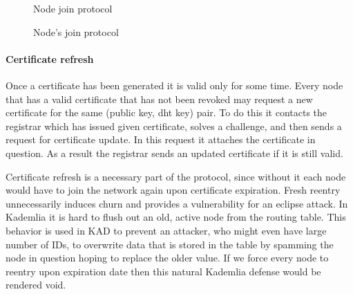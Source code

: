 \begin{figure}
\begin{msc}{Node join protocol}
\setlength{\instdist}{5.5cm}
\setlength{\envinstdist}{3cm}
\setlength{\instwidth}{2.5cm}
\nextlevel
{}
\nextlevel[5]
\nextlevel
{}
\nextlevel[1]


\nextlevel[6]


\nextlevel


\nextlevel[2]
\nextlevel[1]
\end{msc}
\caption{Node's join protocol}
\label{fig:node_join_prot}
\end{figure}

\paragraph{Certificate refresh} Once a certificate has been generated it is
valid only for some time. Every node that has a valid certificate that has not
been revoked may request a new certificate for the same (public key, dht key)
pair.
To do this it contacts the registrar which has issued given certificate,
solves a challenge, and then sends a request for certificate update.
In this request it attaches the certificate in question. As a result the
registrar sends an updated certificate if it is still valid.

Certificate refresh is a necessary part of the protocol, since without it each
node would have to join the network again upon certificate expiration.
Fresh reentry unnecessarily induces churn and provides a vulnerability for an
eclipse attack. 
In Kademlia it is hard to flush out an old, active node from the routing table.
This behavior is used in KAD to prevent an attacker, who might even have large
number of IDs, to overwrite data that is stored in the table by spamming the
node in question hoping to replace the older value. If we force every node to
reentry upon expiration date then this natural Kademlia defense would be
rendered void.

